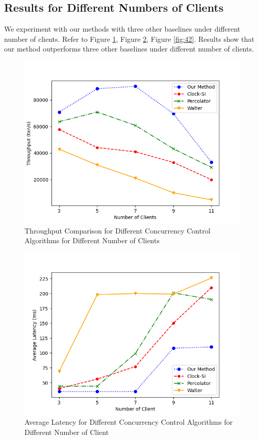 \subsection{Results for Different Numbers of Clients}
We experiment with our methods with three other baselines under different number of clients. Refer to Figure \ref{fig:40}, Figure \ref{fig:41}, Figure \ref{fig:42}. Results show that our method outperforms three other baselines under different number of clients.

\begin{figure}[H]
    \centering
    \includegraphics[width=0.8\linewidth]{figure/40.png}
    \caption{Throughput Comparison for Different Concurrency Control Algorithms for Different Number of Clients}
    \label{fig:40}
\end{figure}
\begin{figure}[H]
    \centering
    \includegraphics[width=0.8\linewidth]{figure/41.png}
    \caption{Average Latency for Different Concurrency Control Algorithms for Different Number of Client}
    \label{fig:41}
\end{figure}
